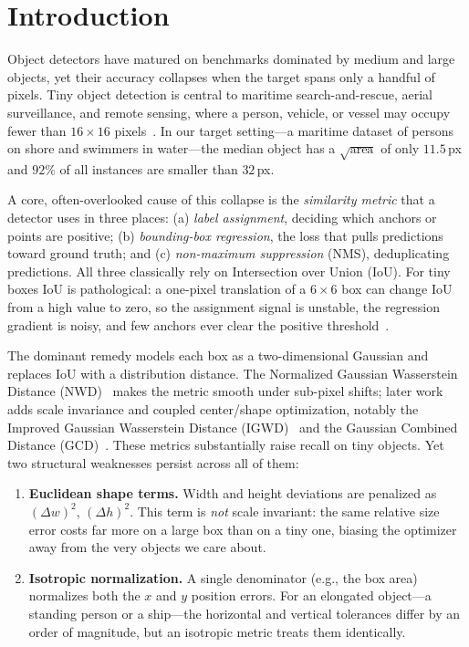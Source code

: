 \documentclass[journal]{IEEEtran}
\begin{document}
\section{Introduction}
\label{sec:intro}

Object detectors have matured on benchmarks dominated by medium and large
objects, yet their accuracy collapses when the target spans only a handful of
pixels. Tiny object detection is central to maritime search-and-rescue, aerial
surveillance, and remote sensing, where a person, vehicle, or vessel may occupy
fewer than $16\times16$ pixels~\cite{yu2020tinyperson,wang2021aitod}. In our
target setting---a maritime dataset of persons on shore and swimmers in
water---the median object has a $\sqrt{\text{area}}$ of only $11.5$\,px and
$92\%$ of all instances are smaller than $32$\,px.

A core, often-overlooked cause of this collapse is the \emph{similarity
metric} that a detector uses in three places: (a) \emph{label assignment},
deciding which anchors or points are positive; (b) \emph{bounding-box
regression}, the loss that pulls predictions toward ground truth; and
(c) \emph{non-maximum suppression} (NMS), deduplicating predictions. All three
classically rely on Intersection over Union (IoU). For tiny boxes IoU is
pathological: a one-pixel translation of a $6\times6$ box can change IoU from a
high value to zero, so the assignment signal is unstable, the regression
gradient is noisy, and few anchors ever clear the positive
threshold~\cite{wang2021nwd,xu2022rfla}.

The dominant remedy models each box as a two-dimensional Gaussian and replaces
IoU with a distribution distance. The Normalized Gaussian Wasserstein Distance
(NWD)~\cite{wang2021nwd} makes the metric smooth under sub-pixel shifts; later
work adds scale invariance and coupled center/shape optimization, notably the
Improved Gaussian Wasserstein Distance (IGWD)~\cite{igwd2026} and the Gaussian
Combined Distance (GCD)~\cite{guan2025gcd}. These metrics substantially raise
recall on tiny objects. Yet two structural weaknesses persist across all of
them:

\begin{enumerate}
  \item \textbf{Euclidean shape terms.} Width and height deviations are
  penalized as $(\Delta w)^2$, $(\Delta h)^2$. This term is \emph{not} scale
  invariant: the same relative size error costs far more on a large box than on
  a tiny one, biasing the optimizer away from the very objects we care about.
  \item \textbf{Isotropic normalization.} A single denominator (e.g., the box
  area) normalizes both the $x$ and $y$ position errors. For an elongated
  object---a standing person or a ship---the horizontal and vertical tolerances
  differ by an order of magnitude, but an isotropic metric treats them
  identically.
\end{enumerate}
\end{document}
